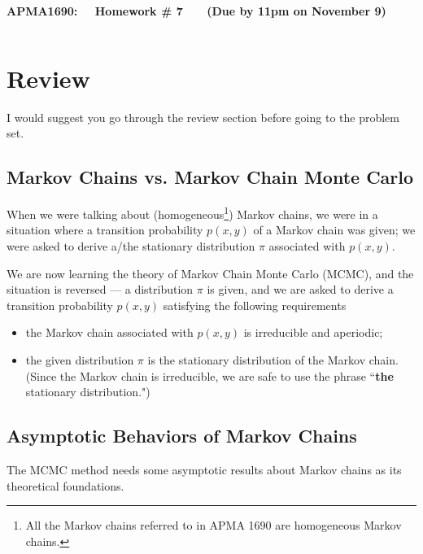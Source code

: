 \documentclass[11pt,letterpaper, leqno]{article}
\numberwithin{equation}{section}
\numberwithin{theorem}{section}
\numberwithin{lemma}{section}
\numberwithin{corollary}{section}
\numberwithin{definition}{section}
\numberwithin{proposition}{section}
\numberwithin{remark}{section}
\numberwithin{example}{section}
\begin{document}
\begin{center}
{\bf \Large APMA1690: ~~Homework \# 7 ~~~(Due by 11pm on November 9)}
\end{center}
\[\]
\medskip

\section{Review}

I would suggest you go through the review section before going to the problem set.


\subsection{Markov Chains vs. Markov Chain Monte Carlo}

When we were talking about (homogeneous\footnote{All the Markov chains referred to in APMA 1690 are homogeneous Markov chains.}) Markov chains, we were in a situation where a transition probability $p(x,y)$ of a Markov chain was given; we were asked to derive a/the stationary distribution $\pi$ associated with $p(x,y)$.

We are now learning the theory of Markov Chain Monte Carlo (MCMC), and the situation is reversed --- a distribution $\pi$ is given, and we are asked to derive a transition probability $p(x,y)$ satisfying the following requirements
\begin{itemize}
    \item the Markov chain associated with $p(x,y)$ is irreducible and aperiodic;
    \item the given distribution $\pi$ is the stationary distribution of the Markov chain. (Since the Markov chain is irreducible, we are safe to use the phrase ``\textbf{the} stationary distribution.")
\end{itemize}

\subsection{Asymptotic Behaviors of Markov Chains}

The MCMC method needs some asymptotic results about Markov chains as its theoretical foundations.
\end{document}
